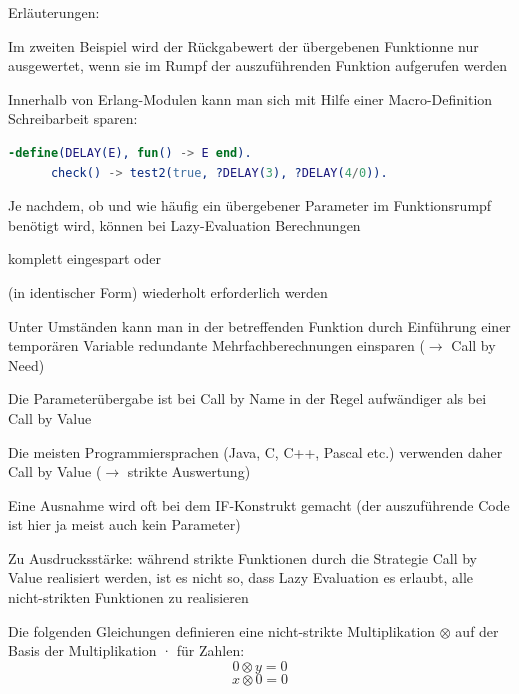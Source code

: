 \documentclass[10pt]{article}
\begin{document}
\begin{itemize*}
    \item Erläuterungen:
    \begin{itemize*}
      \item Im zweiten Beispiel wird der Rückgabewert der übergebenen Funktionne nur ausgewertet, wenn sie im Rumpf der auszuführenden Funktion aufgerufen werden
      \item Innerhalb von Erlang-Modulen kann man sich mit Hilfe einer Macro-Definition Schreibarbeit sparen:
      \begin{lstlisting}[language=erlang] 
      -define(DELAY(E), fun() -> E end).
      check() -> test2(true, ?DELAY(3), ?DELAY(4/0)).
    \end{lstlisting}
    \end{itemize*}
    \item Je nachdem, ob und wie häufig ein übergebener Parameter im Funktionsrumpf benötigt wird, können bei Lazy-Evaluation Berechnungen
    \begin{itemize*}
      \item komplett eingespart oder
      \item (in identischer Form) wiederholt erforderlich werden
      \item Unter Umständen kann man in der betreffenden Funktion durch Einführung einer temporären Variable redundante Mehrfachberechnungen einsparen ($\rightarrow$ Call by Need)
    \end{itemize*}
    \item Die Parameterübergabe ist bei Call by Name in der Regel aufwändiger als bei Call by Value
    \begin{itemize*}
      \item Die meisten Programmiersprachen (Java, C, C++, Pascal etc.) verwenden daher Call by Value ($\rightarrow$ strikte Auswertung)
      \item Eine Ausnahme wird oft bei dem IF-Konstrukt gemacht (der auszuführende Code ist hier ja meist auch kein Parameter)
    \end{itemize*}
    \item Zu Ausdrucksstärke: während strikte Funktionen durch die Strategie Call by Value realisiert werden, ist es nicht so, dass Lazy Evaluation es erlaubt, alle nicht-strikten Funktionen zu realisieren
    \begin{itemize*}
      \item Die folgenden Gleichungen definieren eine nicht-strikte Multiplikation $\otimes$ auf der Basis der Multiplikation · für Zahlen:
      $$0 \otimes y = 0$$
      $$x \otimes 0 = 0$$

\end{itemize*}
\end{itemize*}
\end{document}
